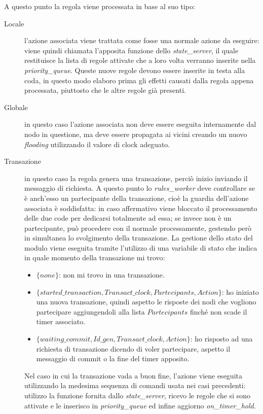 \documentclass[italian]{memoir}
\begin{document}
A questo punto la regola viene processata in base al suo tipo:
\begin{description}
\item[Locale] l'azione associata viene trattata come fosse una normale azione da eseguire: viene quindi chiamata l'apposita funzione dello \textit{state\_server}, il quale restituisce la lista di regole attivate che a loro volta verranno inserite nella \textit{priority\_queue}. Queste nuove regole devono essere inserite in testa alla coda, in questo modo elaboro prima gli effetti causati dalla regola appena processata, piuttosto che le altre regole già presenti.
\item[Globale] in questo caso l'azione associata non deve essere eseguita internamente dal nodo in questione, ma deve essere propagata ai vicini creando un nuovo \textit{flooding} utilizzando il valore di clock adeguato.
\item[Transazione] in questo caso la regola genera una transazione, perciò inizio inviando il messaggio di richiesta. A questo punto lo \textit{rules\_worker} deve controllare se è anch'esso un partecipante della transazione, cioè la guardia dell'azione associata è soddisfatta: in caso affermativo viene bloccato il processamento delle due code per dedicarsi totalmente ad essa; se invece non è un partecipante, può procedere con il normale processamente, gestendo però in simultanea lo svolgimento della transazione. La gestione dello stato del modulo viene eseguita tramite l'utilizzo di una variabile di stato che indica in quale momento della transazione mi trovo:
\begin{itemize}
\item $\{none\}$: non mi trovo in una transazione.
\item $\{started\_transaction, Transact\_clock, Partecipants, Action\}$: ho iniziato una nuova transazione, quindi aspetto le risposte dei nodi che vogliono partecipare aggiungendoli alla lista $Partecipants$ finché non scade il timer associato.
\item $\{waiting\_commit, Id\_gen, Transact\_clock, Action\}$: ho risposto ad una richiesta di transazione dicendo di voler partecipare, aspetto il messaggio di commit o la fine del timer apposito.
\end{itemize}

Nel caso in cui la transazione vada a buon fine, l'azione viene eseguita utilizzando la medesima sequenza di comandi usata nei casi precedenti: utilizzo la funzione fornita dallo \textit{state\_server}, ricevo le regole che si sono attivate e le inserisco in \textit{priority\_queue} ed infine aggiorno \textit{on\_timer\_hold}.

\end{description}
\end{document}
